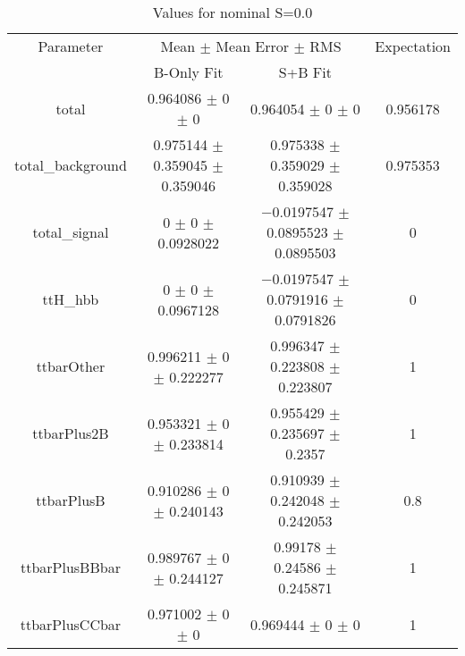 \begin{table}
\centering
\caption{Values for nominal S=0.0}
\begin{tabular}{cccc}
\toprule
Parameter & \multicolumn{2}{c}{Mean $\pm$ Mean Error $\pm$ RMS} & Expectation\\
 & B-Only Fit & S+B Fit & \\
\midrule
total & \num{0.964086} $\pm$ \num{0} $\pm$ \num{0} & \num{0.964054} $\pm$ \num{0} $\pm$ \num{0} & \num{0.956178}\\
total\_background & \num{0.975144} $\pm$ \num{0.359045} $\pm$ \num{0.359046} & \num{0.975338} $\pm$ \num{0.359029} $\pm$ \num{0.359028} & \num{0.975353}\\
total\_signal & \num{0} $\pm$ \num{0} $\pm$ \num{0.0928022} & \num{-0.0197547} $\pm$ \num{0.0895523} $\pm$ \num{0.0895503} & \num{0}\\
ttH\_hbb & \num{0} $\pm$ \num{0} $\pm$ \num{0.0967128} & \num{-0.0197547} $\pm$ \num{0.0791916} $\pm$ \num{0.0791826} & \num{0}\\
ttbarOther & \num{0.996211} $\pm$ \num{0} $\pm$ \num{0.222277} & \num{0.996347} $\pm$ \num{0.223808} $\pm$ \num{0.223807} & \num{1}\\
ttbarPlus2B & \num{0.953321} $\pm$ \num{0} $\pm$ \num{0.233814} & \num{0.955429} $\pm$ \num{0.235697} $\pm$ \num{0.2357} & \num{1}\\
ttbarPlusB & \num{0.910286} $\pm$ \num{0} $\pm$ \num{0.240143} & \num{0.910939} $\pm$ \num{0.242048} $\pm$ \num{0.242053} & \num{0.8}\\
ttbarPlusBBbar & \num{0.989767} $\pm$ \num{0} $\pm$ \num{0.244127} & \num{0.99178} $\pm$ \num{0.24586} $\pm$ \num{0.245871} & \num{1}\\
ttbarPlusCCbar & \num{0.971002} $\pm$ \num{0} $\pm$ \num{0} & \num{0.969444} $\pm$ \num{0} $\pm$ \num{0} & \num{1}\\
\bottomrule
\end{tabular}
\end{table}